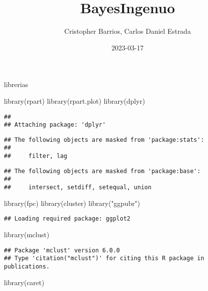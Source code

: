 \documentclass[
]{article}
\title{BayesIngenuo}
\author{Cristopher Barrios, Carlos Daniel Estrada}
\date{2023-03-17}
\newenvironment{Shaded}{\begin{snugshade}}{\end{snugshade}}
\newcommand{\FunctionTok}[1]{\textcolor[rgb]{0.00,0.00,0.00}{#1}}
\newcommand{\NormalTok}[1]{#1}
\newcommand{\StringTok}[1]{\textcolor[rgb]{0.31,0.60,0.02}{#1}}
\begin{document}
\maketitle

librerias

\begin{Shaded}
\begin{Highlighting}[]
\FunctionTok{library}\NormalTok{(rpart)}
\FunctionTok{library}\NormalTok{(rpart.plot)}
\FunctionTok{library}\NormalTok{(dplyr) }
\end{Highlighting}
\end{Shaded}

\begin{verbatim}
## 
## Attaching package: 'dplyr'
\end{verbatim}

\begin{verbatim}
## The following objects are masked from 'package:stats':
## 
##     filter, lag
\end{verbatim}

\begin{verbatim}
## The following objects are masked from 'package:base':
## 
##     intersect, setdiff, setequal, union
\end{verbatim}

\begin{Shaded}
\begin{Highlighting}[]
\FunctionTok{library}\NormalTok{(fpc) }
\FunctionTok{library}\NormalTok{(cluster) }
\FunctionTok{library}\NormalTok{(}\StringTok{"ggpubr"}\NormalTok{) }
\end{Highlighting}
\end{Shaded}

\begin{verbatim}
## Loading required package: ggplot2
\end{verbatim}

\begin{Shaded}
\begin{Highlighting}[]
\FunctionTok{library}\NormalTok{(mclust)}
\end{Highlighting}
\end{Shaded}

\begin{verbatim}
## Package 'mclust' version 6.0.0
## Type 'citation("mclust")' for citing this R package in publications.
\end{verbatim}

\begin{Shaded}
\begin{Highlighting}[]
\FunctionTok{library}\NormalTok{(caret)}
\end{Highlighting}
\end{Shaded}
\end{document}
